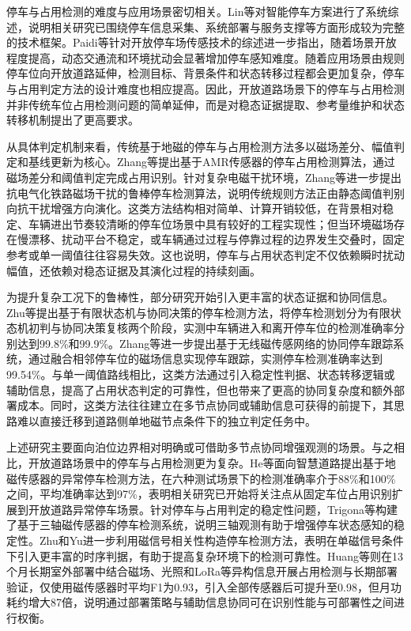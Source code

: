 \documentclass{xdupgthesis}
\begin{document}
停车与占用检测的难度与应用场景密切相关。Lin等\cite{ch4_lin2017surveyparking}对智能停车方案进行了系统综述，说明相关研究已围绕停车信息采集、系统部署与服务支撑等方面形成较为完整的技术框架。Paidi等\cite{R52}针对开放停车场传感技术的综述进一步指出，随着场景开放程度提高，动态交通流和环境扰动会显著增加停车感知难度。随着应用场景由规则停车位向开放道路延伸，检测目标、背景条件和状态转移过程都会更加复杂，停车与占用判定方法的设计难度也相应提高。因此，开放道路场景下的停车与占用检测并非传统车位占用检测问题的简单延伸，而是对稳态证据提取、参考量维护和状态转移机制提出了更高要求。

从具体判定机制来看，传统基于地磁的停车与占用检测方法多以磁场差分、幅值判定和基线更新为核心。Zhang等\cite{ch4_zhang2015amr}提出基于AMR传感器的停车占用检测算法，通过磁场差分和阈值判定完成占用识别。针对复杂电磁干扰环境，Zhang等\cite{ch4_zhang2020railway}进一步提出抗电气化铁路磁场干扰的鲁棒停车检测算法，说明传统规则方法正由静态阈值判别向抗干扰增强方向演化。这类方法结构相对简单、计算开销较低，在背景相对稳定、车辆进出节奏较清晰的停车位场景中具有较好的工程实现性；但当环境磁场存在慢漂移、扰动平台不稳定，或车辆通过过程与停靠过程的边界发生交叠时，固定参考或单一阈值往往容易失效。这也说明，停车与占用状态判定不仅依赖瞬时扰动幅值，还依赖对稳态证据及其演化过程的持续刻画。

为提升复杂工况下的鲁棒性，部分研究开始引入更丰富的状态证据和协同信息。Zhu等\cite{zhu2018parkingfsm}提出基于有限状态机与协同决策的停车检测方法，将停车检测划分为有限状态机初判与协同决策复核两个阶段，实测中车辆进入和离开停车位的检测准确率分别达到99.8\%和99.9\%。Zhang等\cite{ch4_zhang2020tracking}进一步提出基于无线磁传感网络的协同停车跟踪系统，通过融合相邻停车位的磁场信息实现停车跟踪，实测停车检测准确率达到99.54\%。与单一阈值路线相比，这类方法通过引入稳定性判据、状态转移逻辑或辅助信息，提高了占用状态判定的可靠性，但也带来了更高的协同复杂度和额外部署成本。同时，这类方法往往建立在多节点协同或辅助信息可获得的前提下，其思路难以直接迁移到道路侧单地磁节点条件下的独立判定任务中。

上述研究主要面向泊位边界相对明确或可借助多节点协同增强观测的场景。与之相比，开放道路场景中的停车与占用检测更为复杂。He等\cite{R43}面向智慧道路提出基于地磁传感器的异常停车检测方法，在六种测试场景下的检测准确率介于88\%和100\%之间，平均准确率达到97\%，表明相关研究已开始将关注点从固定车位占用识别扩展到开放道路异常停车场景。针对停车与占用判定的稳定性问题，Trigona等\cite{ch4_trigona2016smartparking}构建了基于三轴磁传感器的停车检测系统，说明三轴观测有助于增强停车状态感知的稳定性。Zhu和Yu\cite{ch4_zhu2015parkingcorr}进一步利用磁信号相关性构造停车检测方法，表明在单磁信号条件下引入更丰富的时序判据，有助于提高复杂环境下的检测可靠性。Huang等\cite{ch4_huang2017easydeploy}则在13个月长期室外部署中结合磁场、光照和LoRa等异构信息开展占用检测与长期部署验证，仅使用磁传感器时平均F1为0.93，引入全部传感器后可提升至0.98，但月功耗约增大87倍，说明通过部署策略与辅助信息协同可在识别性能与可部署性之间进行权衡。
\end{document}
